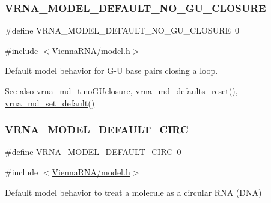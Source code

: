 \subsubsection{\texorpdfstring{V\+R\+N\+A\+\_\+\+M\+O\+D\+E\+L\+\_\+\+D\+E\+F\+A\+U\+L\+T\+\_\+\+N\+O\+\_\+\+G\+U\+\_\+\+C\+L\+O\+S\+U\+RE}{VRNA\_MODEL\_DEFAULT\_NO\_GU\_CLOSURE}}
{\footnotesize\ttfamily \#define V\+R\+N\+A\+\_\+\+M\+O\+D\+E\+L\+\_\+\+D\+E\+F\+A\+U\+L\+T\+\_\+\+N\+O\+\_\+\+G\+U\+\_\+\+C\+L\+O\+S\+U\+RE~0}



{\ttfamily \#include $<$\hyperlink{model_8h}{Vienna\+R\+N\+A/model.\+h}$>$}



Default model behavior for G-\/U base pairs closing a loop. 

\begin{DoxySeeAlso}{See also}
\hyperlink{group__model__details_a7e883db1f33f8f3baa5c9b140350c78e}{vrna\+\_\+md\+\_\+t.\+no\+G\+Uclosure}, \hyperlink{group__model__details_ga70834424cf804d149937de89f80ceb45}{vrna\+\_\+md\+\_\+defaults\+\_\+reset()}, \hyperlink{group__model__details_ga8ac6ff84936282436f822644bf841f66}{vrna\+\_\+md\+\_\+set\+\_\+default()} 
\end{DoxySeeAlso}
\mbox{\label{group__model__details_ga22059033db7bcd875c51fec32425490a}} 
\subsubsection{\texorpdfstring{V\+R\+N\+A\+\_\+\+M\+O\+D\+E\+L\+\_\+\+D\+E\+F\+A\+U\+L\+T\+\_\+\+C\+I\+RC}{VRNA\_MODEL\_DEFAULT\_CIRC}}
{\footnotesize\ttfamily \#define V\+R\+N\+A\+\_\+\+M\+O\+D\+E\+L\+\_\+\+D\+E\+F\+A\+U\+L\+T\+\_\+\+C\+I\+RC~0}



{\ttfamily \#include $<$\hyperlink{model_8h}{Vienna\+R\+N\+A/model.\+h}$>$}



Default model behavior to treat a molecule as a circular R\+NA (D\+NA) 

